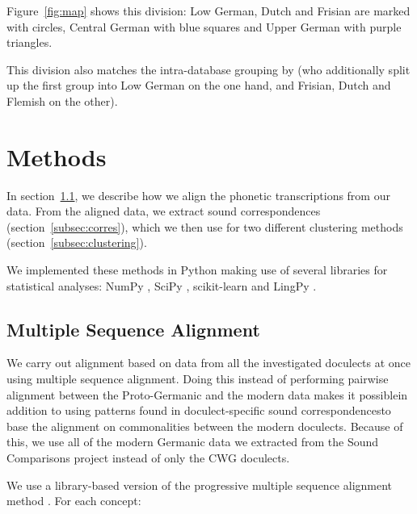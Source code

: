 \documentclass[a4paper]{article}
\begin{document}
Figure~\ref{fig:map} shows this division:
Low German, Dutch and Frisian are marked with circles,
Central German with blue squares and Upper German with purple triangles.

This division also matches the intra-database grouping by \citet{heggarty2018sound}
(who additionally split up the first group into
Low German on the one hand,
and Frisian, Dutch and Flemish on the other).

\section{Methods}
\label{sec:methods}

In section~\ref{subsec:msa}, we describe how we align
the phonetic transcriptions from our data.
From the aligned data, we extract sound correspondences
(section~\ref{subsec:corres}), which we then use for
two different clustering methods (section~\ref{subsec:clustering}).

We implemented these methods in Python
making use of several libraries for statistical analyses:
NumPy \citep{oliphant2006guide}, SciPy \citep{jones2001scipy},
scikit-learn \citep{pedregosa2011scikit-learn} and LingPy \citep{list2018lingpy}.

\subsection{Multiple Sequence Alignment}
\label{subsec:msa}

We carry out alignment based on data from
all the investigated doculects at once using multiple sequence alignment.
Doing this instead of performing pairwise alignment between
the Proto-Germanic and the modern data makes it possible\textemdash{}in addition to using patterns found in doculect-specific
sound correspondences\textemdash{}to base the alignment on commonalities
between the modern doculects.
Because of this, we use all of the modern Germanic data
we extracted from the Sound Comparisons project
instead of only the CWG doculects.

We use a library-based version \citep{notredame2000t-coffee:} of the progressive multiple sequence alignment method \citep{thompson1994clustal}.
For each concept:
\end{document}
